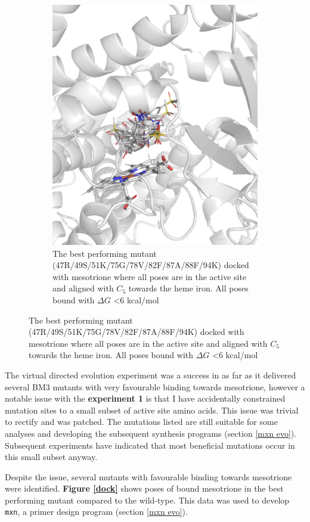 \documentclass{article}
\begin{document}
\begin{figure}[H]
\begin{subfigure}{0.49\textwidth}
		\includegraphics[width=\linewidth]{figs/best-mesotrione-RSKGVFAFK.png}
		\caption{The best performing mutant (47R/49S/51K/75G/78V/82F/87A/88F/94K)
docked with mesotrione where all poses are in the active site and aligned with $C_5$ towards the heme iron. All poses bound with $\Delta G$ <6 kcal/mol}
	\end{subfigure}
\end{figure}
The virtual directed evolution experiment was a success in as far as it delivered several BM3 mutants with very favourable binding towards mesotrione, however a notable issue with the \textbf{experiment 1} is that I have accidentally constrained mutation sites to a small subset of active site amino acids. This issue was trivial to rectify and was patched.  The mutations listed are still suitable for some analyses and developing the subsequent synthesis programs (section \ref{mxn evo}). Subsequent experiments have indicated that most beneficial mutations occur in this small subset anyway.
\par
Despite the issue, several mutants with favourable binding towards mesotrione were identified. \textbf{Figure \ref{dock}} shows poses of bound mesotrione in the best performing mutant compared to the wild-type. This data was used to develop \texttt{mxn}, a primer design program (section \ref{mxn evo}).
\par
\end{document}
